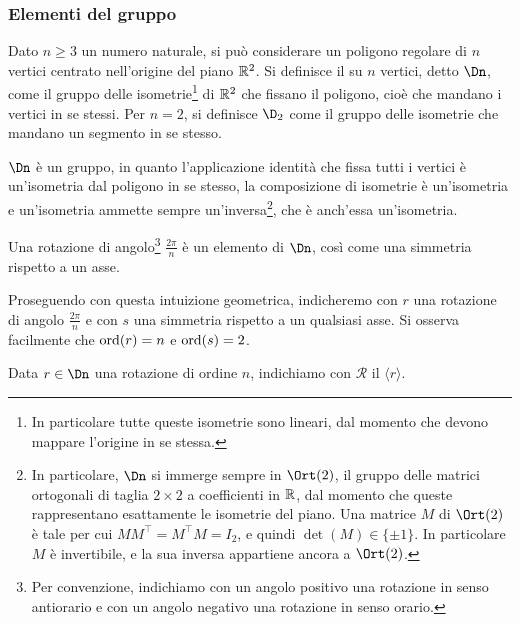 \documentclass[11pt]{scrartcl}
\begin{document}
	\subsubsection{Elementi del gruppo}
	
	\begin{definition}
		Dato $n \geq 3$ un numero naturale, si può considerare un poligono regolare di $n$ vertici centrato nell'origine del piano $\mathbb R^2$. Si definisce il
		 su $n$ vertici, detto $\Dn$, come il gruppo
		delle isometrie\footnote{
			In particolare tutte queste isometrie sono lineari, dal momento che
			devono mappare l'origine in se stessa.
		} di $\mathbb R^2$ che fissano il poligono, cioè che mandano i 
		vertici in se stessi. Per $n = 2$, si definisce $\D_2$ come il gruppo delle
		isometrie che mandano un segmento in se stesso.
	\end{definition}
	
	\begin{remark}
		$\Dn$ è un gruppo, in quanto l'applicazione identità che 
		fissa tutti i vertici è un'isometria dal poligono in se stesso, la 
		composizione di isometrie è un'isometria e un'isometria ammette sempre 
		un'inversa\footnote{
			In particolare, $\Dn$ si immerge sempre in $\Ort(2)$, il gruppo delle matrici ortogonali
			di taglia $2 \times 2$ a coefficienti in $\mathbb R$, dal momento che queste rappresentano esattamente le
			isometrie del piano. Una matrice $M$ di $\Ort(2)$ è tale per cui $M M^\top = M^\top M = I_2$, e quindi $\det(M) \in \{\pm 1\}$. In particolare $M$ è invertibile, e la
			sua inversa appartiene ancora a $\Ort(2)$.
		}, che è anch'essa un'isometria.
	\end{remark}
	
	\begin{remark}
		Una rotazione di angolo\footnote{
			Per convenzione, indichiamo con un angolo positivo una rotazione in senso antiorario e con un angolo negativo una rotazione in senso orario.
		} $\frac{2\pi}{n}$ è un elemento di $\Dn$,
		così come una simmetria rispetto a un asse.
	\end{remark}
	
	Proseguendo con questa intuizione geometrica, indicheremo con $r$ una rotazione
	di angolo $\frac{2\pi}{n}$ e con $s$ una simmetria rispetto a
	un qualsiasi asse. Si osserva facilmente che $\operatorname{ord}(r) = n$ e $\operatorname{ord}(s) = 2$.
	
	\begin{definition}
		Data $r \in \Dn$ una rotazione di ordine $n$, indichiamo con $\mathcal{R}$ il
		 $\langle r\rangle$.
	\end{definition}
	
\end{document}
